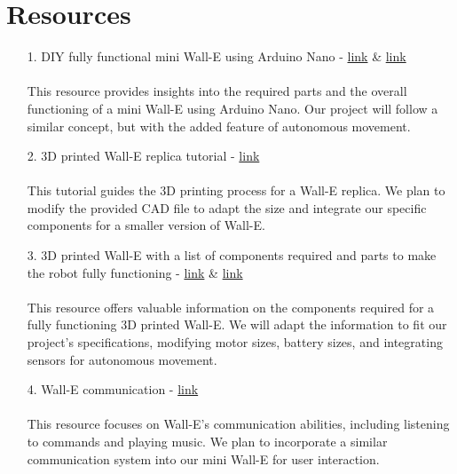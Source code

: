 \documentclass[12pt]{article}
\begin{document}
\section{Resources} %
\begin{itemize}
    \item[1.] DIY fully functional mini Wall-E using Arduino Nano - \href{https://www.youtube.com/watch?v=iaqVNqsvQwI}{link} \& \href{https://www.youtube.com/watch?v=Cqv2w0qYf-s}{link} \\\\
        This resource provides insights into the required parts and the overall functioning of a mini Wall-E using Arduino Nano. Our project will follow a similar concept, but with the added feature of autonomous movement.
    \item[2.] 3D printed Wall-E replica tutorial - \href{https://www.youtube.com/watch?v=SJ2odjtOjxY}{link} \\\\
        This tutorial guides the 3D printing process for a Wall-E replica. We plan to modify the provided CAD file to adapt the size and integrate our specific components for a smaller version of Wall-E.
    \item[3.] 3D printed Wall-E with a list of components required and parts to make the robot fully functioning - \href{https://wired.chillibasket.com/3d-printed-wall-e/}{link} \& \href{https://youtu.be/ZRK9f4FZlD8}{link} \\\\
        This resource offers valuable information on the components required for a fully functioning 3D printed Wall-E. We will adapt the information to fit our project's specifications, modifying motor sizes, battery sizes, and integrating sensors for autonomous movement.
    \item[4.] Wall-E communication - \href{https://blog.arduino.cc/2021/07/03/build-your-own-adorable-talking-wall-e-robot/}{link} \\\\
        This resource focuses on Wall-E's communication abilities, including listening to commands and playing music. We plan to incorporate a similar communication system into our mini Wall-E for user interaction.
\end{itemize}
\end{document}
